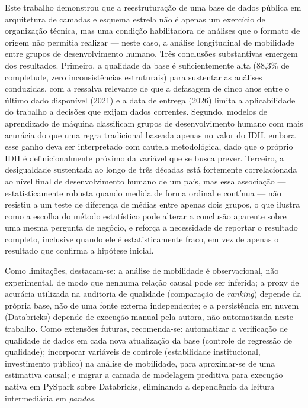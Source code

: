 \documentclass[11pt,a4paper]{article}
\begin{document}
Este trabalho demonstrou que a reestruturação de uma base de dados pública em arquitetura de camadas e esquema estrela não é apenas um exercício de organização técnica, mas uma condição habilitadora de análises que o formato de origem não permitia realizar --- neste caso, a análise longitudinal de mobilidade entre grupos de desenvolvimento humano. Três conclusões substantivas emergem dos resultados. Primeiro, a qualidade da base é suficientemente alta (88,3\% de completude, zero inconsistências estruturais) para sustentar as análises conduzidas, com a ressalva relevante de que a defasagem de cinco anos entre o último dado disponível (2021) e a data de entrega (2026) limita a aplicabilidade do trabalho a decisões que exijam dados correntes. Segundo, modelos de aprendizado de máquina classificam grupos de desenvolvimento humano com mais acurácia do que uma regra tradicional baseada apenas no valor do IDH, embora esse ganho deva ser interpretado com cautela metodológica, dado que o próprio IDH é definicionalmente próximo da variável que se busca prever. Terceiro, a desigualdade sustentada ao longo de três décadas está fortemente correlacionada ao nível final de desenvolvimento humano de um país, mas essa associação --- estatisticamente robusta quando medida de forma ordinal e contínua --- não resistiu a um teste de diferença de médias entre apenas dois grupos, o que ilustra como a escolha do método estatístico pode alterar a conclusão aparente sobre uma mesma pergunta de negócio, e reforça a necessidade de reportar o resultado completo, inclusive quando ele é estatisticamente fraco, em vez de apenas o resultado que confirma a hipótese inicial.

Como limitações, destacam-se: a análise de mobilidade é observacional, não experimental, de modo que nenhuma relação causal pode ser inferida; a proxy de acurácia utilizada na auditoria de qualidade (comparação de \textit{ranking}) depende da própria base, não de uma fonte externa independente; e a persistência em nuvem (Databricks) depende de execução manual pela autora, não automatizada neste trabalho. Como extensões futuras, recomenda-se: automatizar a verificação de qualidade de dados em cada nova atualização da base (controle de regressão de qualidade); incorporar variáveis de controle (estabilidade institucional, investimento público) na análise de mobilidade, para aproximar-se de uma estimativa causal; e migrar a camada de modelagem preditiva para execução nativa em PySpark sobre Databricks, eliminando a dependência da leitura intermediária em \textit{pandas}.
\end{document}
